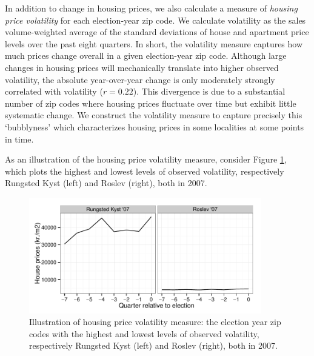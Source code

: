 \documentclass[12pt,a4paper]{article}
\begin{document}
In addition to change in housing prices, we also calculate a measure of \textit{housing price volatility} for each election-year zip code. We calculate volatility as the sales volume-weighted average of the standard deviations of house and apartment price levels over the past eight quarters. In short, the volatility measure captures how much prices change overall in a given election-year zip code. Although large changes in housing prices will mechanically translate into higher observed volatility, the absolute year-over-year change is only moderately strongly correlated with volatility ($r=0.22$). This divergence is due to a substantial number of zip codes where housing prices fluctuate over time but exhibit little systematic change. We construct the volatility measure to capture precisely this `bubblyness' which characterizes housing prices in some localities at some points in time.

As an illustration of the housing price volatility measure, consider Figure \ref{volcases}, which plots the highest and lowest levels of observed volatility, respectively Rungsted Kyst (left) and Roslev (right), both in 2007.

\begin{figure}[htbp!]
	\includegraphics[width=0.9\textwidth]{../figures/volcases}
	\centering
	\caption{Illustration of housing price volatility measure: the election year zip codes with the highest and lowest levels of observed volatility, respectively Rungsted Kyst (left) and Roslev (right), both in 2007.}\label{volcases}
\end{figure}
\end{document}
